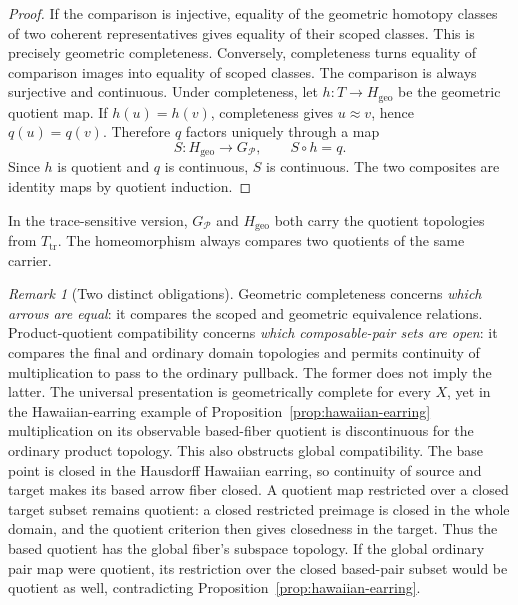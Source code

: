 \documentclass[10pt,reqno]{amsart}
\theoremstyle{definition}
\theoremstyle{plain}
\theoremstyle{remark}
\newtheorem{remark}[definition]{Remark}
\begin{document}
\begin{proof}
If the comparison is injective, equality of the geometric homotopy classes
of two coherent representatives gives equality of their scoped classes.
This is precisely geometric completeness.  Conversely, completeness turns equality of comparison images
into equality of scoped classes.  The comparison is always surjective and
continuous.  Under completeness, let
$h:T\to H_{\mathrm{geo}}$ be the geometric quotient map.  If
$h(u)=h(v)$, completeness gives $u\approx v$, hence $q(u)=q(v)$.  Therefore
$q$ factors uniquely through a map
\[
  S:H_{\mathrm{geo}}\longrightarrow G_{\mathcal P},
  \qquad S\circ h=q.
\]
Since $h$ is quotient and $q$ is continuous, $S$ is continuous.  The two
composites are identity maps by quotient induction.
\end{proof}

In the trace-sensitive version, $G_{\mathcal P}$ and $H_{\mathrm{geo}}$ both
carry the quotient topologies from $T_{\mathrm{tr}}$.  The homeomorphism always
compares two quotients of the same carrier.

\begin{remark}[Two distinct obligations]
Geometric completeness concerns \emph{which arrows are equal}:
it compares the scoped and geometric equivalence relations.
Product-quotient compatibility concerns \emph{which composable-pair sets
are open}: it compares the final and ordinary domain topologies and permits
continuity of multiplication to pass to the ordinary pullback.
The former does not imply the latter.  The universal presentation is
geometrically complete for every $X$, yet in the Hawaiian-earring example of
Proposition~\ref{prop:hawaiian-earring} multiplication on its observable
based-fiber quotient is discontinuous for the ordinary product topology.
This also obstructs global compatibility. The base point is closed in the
Hausdorff Hawaiian earring, so continuity of source and target makes its
based arrow fiber closed. A quotient map restricted over a closed target
subset remains quotient: a closed restricted preimage is closed in the
whole domain, and the quotient criterion then gives closedness in the
target. Thus the based quotient has the global fiber's subspace topology.
If the global ordinary pair map were quotient, its restriction over the
closed based-pair subset would be quotient as well, contradicting
Proposition~\ref{prop:hawaiian-earring}.
\end{remark}
\end{document}
